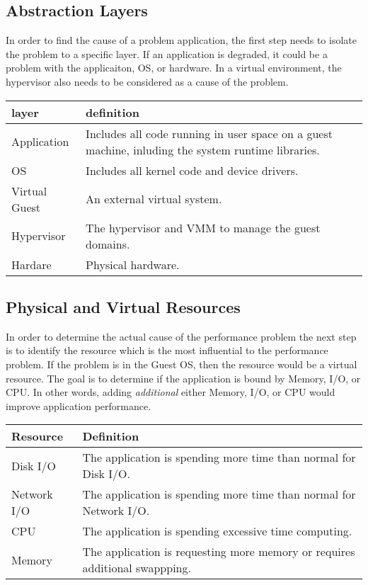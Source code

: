 \subsection{Abstraction Layers}
In order to find the cause of a problem application, the first step needs to isolate the problem to a specific layer.  If an application is degraded, it could be a problem with the applicaiton, OS, or hardware.  In a virtual environment, the hypervisor also needs to be considered as a cause of the problem.  
\newline
\begin{tabular}{ l p{5cm} }
  layer & definition \\
  \hline
  Application & Includes all code running in user space on a guest machine, inluding the system runtime libraries. \\
  OS & Includes all kernel code and device drivers. \\
  Virtual Guest & An external virtual system. \\
  Hypervisor & The hypervisor and VMM to manage the guest domains. \\
  Hardare & Physical hardware. \\
\end{tabular}

\subsection{Physical and Virtual Resources}
In order to determine the actual cause of the performance problem the next step is to identify the resource which is the most influential to the performance problem.  If the problem is in the Guest OS, then the resource would be a virtual resource.  The goal is to determine if the application is bound by Memory, I/O, or CPU.  In other words, adding \emph{additional} either Memory, I/O, or CPU would improve application performance.  
\newline

\begin{tabular}{ l p{5cm} }
  Resource & Definition \\
  \hline
  Disk I/O & The application is spending more time than normal for Disk I/O. \\
  Network I/O & The application is spending more time than normal for Network I/O. \\
  CPU & The application is spending excessive time computing. \\
  Memory & The application is requesting more memory or requires additional swappping. \\
\end{tabular}

